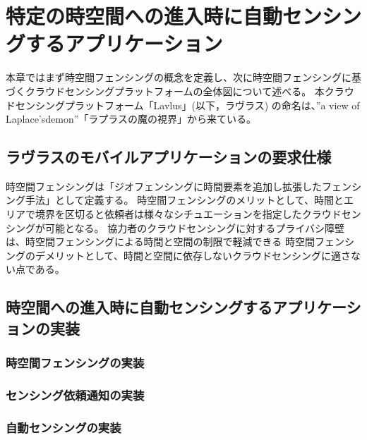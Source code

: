 \chapter{特定の時空間への進入時に自動センシングするアプリケーション}
\thispagestyle{myheadings}
本章ではまず時空間フェンシングの概念を定義し、次に時空間フェンシングに基づくクラウドセンシングプラットフォームの全体図について述べる。
本クラウドセンシングプラットフォーム「Lavlus」(以下，ラヴラス) の命名は、”a view of Laplace’sdemon”「ラプラスの魔の視界」から来ている。

\section{ラヴラスのモバイルアプリケーションの要求仕様}
時空間フェンシングは「ジオフェンシングに時間要素を追加し拡張したフェンシング手法」として定義する。
時空間フェンシングのメリットとして、時間とエリアで境界を区切ると依頼者は様々なシチュエーションを指定したクラウドセンシングが可能となる。
協力者のクラウドセンシングに対するプライバシ障壁は、時空間フェンシングによる時間と空間の制限で軽減できる
時空間フェンシングのデメリットとして、時間と空間に依存しないクラウドセンシングに適さない点である。

\section{時空間への進入時に自動センシングするアプリケーションの実装}

\subsection{時空間フェンシングの実装}

\subsection{センシング依頼通知の実装}

\subsection{自動センシングの実装}


